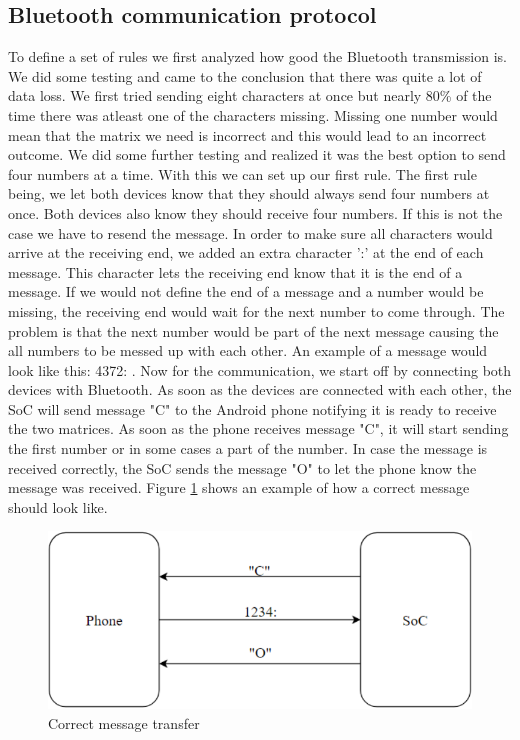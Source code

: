 \documentclass[a4paper, 11pt]{report}
\begin{document}
	\subsection{Bluetooth communication protocol}
To define a set of rules we first analyzed how good the Bluetooth transmission is. We did some testing and came to the conclusion that there was quite a lot of data loss. We first tried sending eight characters at once but nearly 80\% of the time there was atleast one of the characters missing. Missing one number would mean that the matrix we need is incorrect and this would lead to an incorrect outcome. We did some further testing and realized it was the best option to send four numbers at a time. With this we can set up our first rule. The first rule being, we let both devices know that they should always send four numbers at once. Both devices also know they should receive four numbers. If this is not the case we have to resend the message.
In order to make sure all characters would arrive at the receiving end, we added an extra character ':' at the end of each message. This character lets the receiving end know that it is the end of a message. If we would not define the end of a message and a number would be missing, the receiving end would wait for the next number to come through. The problem is that the next number would be part of the next message causing the all numbers to be messed up with each other. An example of a message would look like this: 4372: .
Now for the communication, we start off by connecting both devices with Bluetooth. As soon as the devices are connected with each other, the SoC will send message "C" to the Android phone notifying it is ready to receive the two matrices. As soon as the phone receives message "C", it will start sending the first number or in some cases a part of the number. In case the message is received correctly, the SoC sends the message "O" to let the phone know the message was received. Figure \ref{fig:correctMessage} shows an example of how a correct message should look like.

\begin{figure}[ht]
\centering
\includegraphics[scale=0.7]{images/CorrectMsg.pdf}
\caption{Correct message transfer}\label{fig:correctMessage}
\end{figure}
\end{document}
